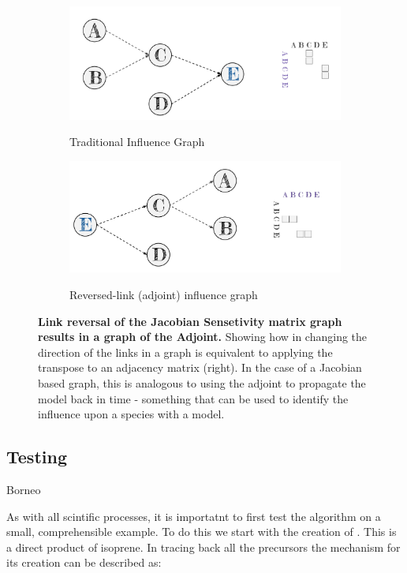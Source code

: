 \begin{figure}[H]
    \centering
\begin{subfigure}{.9\textwidth}
  \centering
  \includegraphics[width=\textwidth]{figures_c3/traditional.pdf}
  \label{fig:prtrad}
  \caption{Traditional Influence Graph}
\end{subfigure}

\begin{subfigure}{.9\textwidth }
  \centering
  \includegraphics[width=\textwidth]{figures_c3/adjoint.pdf}
  \label{fig:pradj}
  \caption{Reversed-link (adjoint) influence graph}
\end{subfigure}

\caption{\textbf{Link reversal of the Jacobian Sensetivity matrix graph results in a graph of the Adjoint.} Showing how in changing the direction of the links in a graph is equivalent to applying the transpose to an adjacency matrix (right). In the case of a Jacobian based graph, this is analogous to using the adjoint to propagate the model back in time - something that can be used to identify the influence upon a species with a model.}
\end{figure}


\subsection{Testing}
Borneo


As with all scintific processes, it is importatnt to first test the algorithm on a small, comprehensible example. To do this we start with the creation of . This is a direct product of isoprene. In tracing back all the precursors the mechanism for its creation can be described as: 

